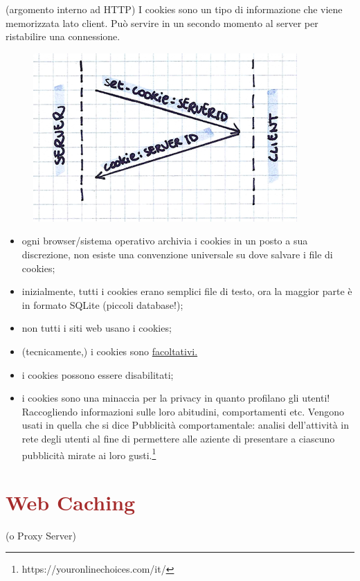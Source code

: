\noindent (argomento interno ad HTTP) I cookies sono un tipo di informazione che viene memorizzata lato client. Può servire in un secondo momento al server per ristabilire una connessione.

\begin{figure} [h]
    \centering
    \includegraphics[width=0.6\linewidth]{Figures/02/cookies.png}
\end{figure}
\begin{itemize}
    \item ogni browser/sistema operativo archivia i cookies in un posto a sua discrezione, non esiste una convenzione universale su dove salvare i file di cookies;
    \item inizialmente, tutti i cookies erano semplici file di testo, ora la maggior parte è in formato SQLite (piccoli database!);
    \item non tutti i siti web usano i cookies;
    \item (tecnicamente,) i cookies sono \underline{facoltativi.}
    \item i cookies possono essere disabilitati;
    \item i cookies sono una minaccia per la privacy in quanto profilano gli utenti! Raccogliendo informazioni sulle loro abitudini, comportamenti etc. Vengono usati in quella che si dice Pubblicità comportamentale: analisi dell'attività in rete degli utenti al fine di permettere alle aziente di presentare a ciascuno pubblicità mirate ai loro gusti.\footnote{https://youronlinechoices.com/it/}
\end{itemize}


\section*{\textcolor{Brown}{Web Caching}}
\noindent (o Proxy Server)\\

